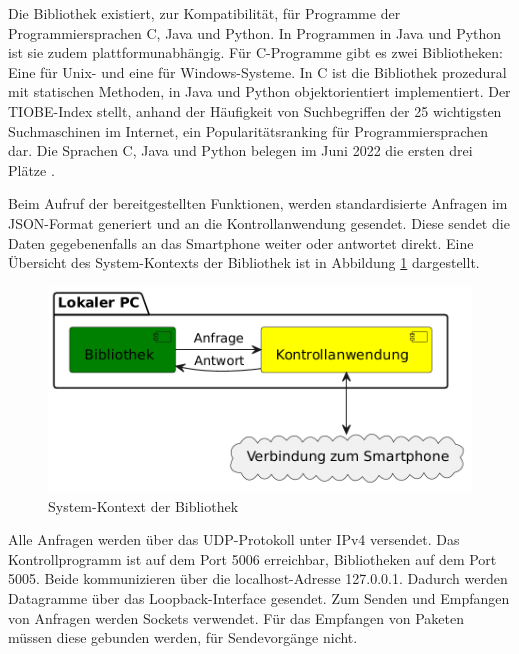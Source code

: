 \documentclass[11pt,a4paper]{report}
\begin{document}
Die Bibliothek existiert, zur Kompatibilität, für Programme der Programmiersprachen C, Java und Python.
In Programmen in Java und Python ist sie zudem plattformunabhängig.
Für C-Programme gibt es zwei Bibliotheken: Eine für Unix- und eine für Windows-Systeme.
In C ist die Bibliothek prozedural mit statischen Methoden, in Java und Python objektorientiert implementiert.
Der TIOBE-Index stellt, anhand der Häufigkeit von Suchbegriffen der 25 wichtigsten Suchmaschinen im Internet, ein Popularitätsranking für Programmiersprachen dar.
Die Sprachen C, Java und Python belegen im Juni 2022 die ersten drei Plätze \cite{tiobe}.

Beim Aufruf der bereitgestellten Funktionen, werden standardisierte Anfragen im JSON-Format generiert und an die Kontrollanwendung gesendet.
Diese sendet die Daten gegebenenfalls an das Smartphone weiter oder antwortet direkt.
Eine Übersicht des System-Kontexts der Bibliothek ist in Abbildung \ref{fig:Schnittstelle Bibliothek} dargestellt.
\begin{figure}[htbp]
  \centering
  \includegraphics[width=.6\textwidth]{images/lib_server_connection}
  \caption{System-Kontext der Bibliothek}
  \label{fig:Schnittstelle Bibliothek}
\end{figure}

Alle Anfragen werden über das UDP-Protokoll unter IPv4 versendet.
Das Kontrollprogramm ist auf dem Port 5006 erreichbar, Bibliotheken auf dem Port 5005.
Beide kommunizieren über die localhost-Adresse 127.0.0.1.
Dadurch werden Datagramme über das Loopback-Interface gesendet.
Zum Senden und Empfangen von Anfragen werden Sockets verwendet.
Für das Empfangen von Paketen müssen diese gebunden werden, für Sendevorgänge nicht.
\end{document}
